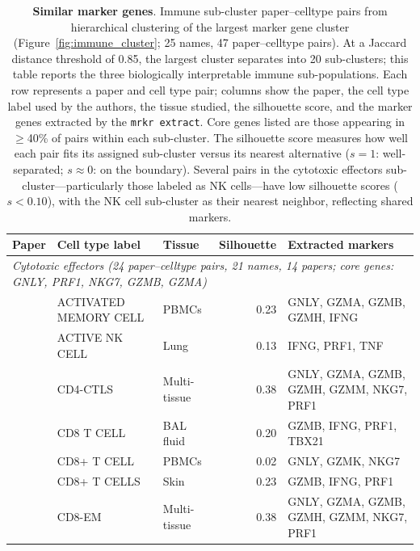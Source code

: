 \documentclass[10pt,twocolumn]{article}
\theoremstyle{plain}
\theoremstyle{definition}
\theoremstyle{remark}
\begin{document}
\begin{table}[ht!]
  \centering
  \caption{\textbf{Similar marker genes}. Immune sub-cluster paper--celltype pairs from hierarchical clustering of the largest marker gene cluster (Figure~\ref{fig:immune_cluster}; 25 names, 47 paper--celltype pairs). At a Jaccard distance threshold of 0.85, the largest cluster separates into 20 sub-clusters; this table reports the three biologically interpretable immune sub-populations. Each row represents a paper and cell type pair; columns show the paper, the cell type label used by the authors, the tissue studied, the silhouette score, and the marker genes extracted by the \texttt{mrkr extract}. Core genes listed are those appearing in $\geq$40\% of pairs within each sub-cluster. The silhouette score measures how well each pair fits its assigned sub-cluster versus its nearest alternative ($s{=}1$: well-separated; $s{\approx}0$: on the boundary). Several pairs in the cytotoxic effectors sub-cluster---particularly those labeled as NK cells---have low silhouette scores ($s < 0.10$), with the NK cell sub-cluster as their nearest neighbor, reflecting shared markers.}
  \label{tab:immune_subclusters}%
  \footnotesize
  \begin{tabular}{@{}l l l r p{5.2cm}@{}}
  \toprule
  Paper & Cell type label & Tissue & Silhouette & Extracted markers \\
  \midrule
  \multicolumn{5}{l}{\textit{Cytotoxic effectors (24 paper--celltype pairs, 21 names, 14 papers; core genes: GNLY, PRF1, NKG7, GZMB, GZMA)}} \\[2pt]
  \citep{Lawlor2020}         & ACTIVATED MEMORY CELL   & PBMCs     & 0.23 & GNLY, GZMA, GZMB, GZMH, IFNG\\
  \citep{Kim2024immune}      & ACTIVE NK CELL          & Lung      & 0.13 & IFNG, PRF1, TNF\\
  \citep{Turiello2025}       & CD4-CTLS                & Multi-tissue & 0.38 & GNLY, GZMA, GZMB, GZMH, GZMM, NKG7, PRF1\\
  \citep{Asaba2024}          & CD8 T CELL              & BAL fluid & 0.20 & GZMB, IFNG, PRF1, TBX21\\
  \citep{Zhao2024}           & CD8+ T CELL             & PBMCs     & 0.02 & GNLY, GZMK, NKG7\\
  \citep{Onfroy2025}         & CD8+ T CELLS            & Skin      & 0.23 & GZMB, IFNG, PRF1\\
  \citep{Turiello2025}       & CD8-EM                  & Multi-tissue & 0.38 & GNLY, GZMA, GZMB, GZMH, GZMM, NKG7, PRF1\\

\end{tabular}
\end{table}
\end{document}
